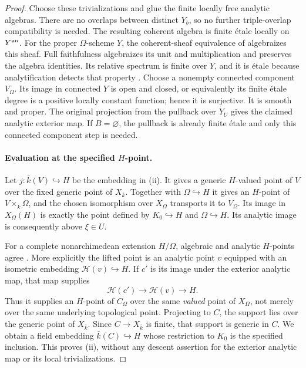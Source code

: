 \begin{proof}
Choose these trivializations and glue the finite locally free
analytic algebras. There are no overlaps between distinct $Y_b$,
so no further triple-overlap compatibility is needed. The resulting
coherent algebra is finite \'etale locally on $Y^{\rm an}$.
For the proper $\Omega$-scheme $Y$, the coherent-sheaf equivalence
of \citet[Appendix A, Theorem A.1(ii)]{D_Poineau2010} algebraizes
this sheaf. Full faithfulness algebraizes its unit and
multiplication and preserves the algebra identities. Its relative
spectrum is finite over $Y$, and it is \'etale because
analytification detects that property
\citep[Fact 5.1.5]{D_Temkin2010}. Choose a nonempty connected
component $V_\Omega$. Its image in connected $Y$ is open and
closed, or equivalently its finite \'etale degree is a positive
locally constant function; hence it is surjective. It is smooth
and proper. The original projection from the pullback over $Y_U$
gives the claimed analytic exterior map. If $B=\varnothing$,
the pullback is already finite \'etale and only this connected
component step is needed.

\paragraph{Evaluation at the specified $H$-point.}
\label{clm:D15-evaluation}
Let $j:\bar k(V)\hookrightarrow H$ be the embedding in (ii).
It gives a generic $H$-valued point of $V$ over the fixed generic
point of $X_{\bar k}$. Together with $\Omega\hookrightarrow H$
it gives an $H$-point of $V\times_{\bar k}\Omega$, and the chosen
isomorphism over $X_\Omega$ transports it to $V_\Omega$.
Its image in $X_\Omega(H)$ is exactly the point defined by
$K_0\hookrightarrow H$ and $\Omega\hookrightarrow H$.
Its analytic image is consequently above $\xi\in U$.

For a complete nonarchimedean extension $H/\Omega$, algebraic and
analytic $H$-points agree
\citep[Fact 5.1.3]{D_Temkin2010}. More explicitly the lifted point
is an analytic point $v$ equipped with an isometric embedding
$\mathcal H(v)\hookrightarrow H$. If $c'$ is its image under the
exterior analytic map, that map supplies
\[
             \mathcal H(c')\longrightarrow\mathcal H(v)
                                      \longrightarrow H.
\]
Thus it supplies an $H$-point of $C_\Omega$ over the same
\emph{valued} point of $X_\Omega$, not merely over the same
underlying topological point. Projecting to $C$, the support lies
over the generic point of $X_{\bar k}$. Since $C\to X_{\bar k}$
is finite, that support is generic in $C$. We obtain a field
embedding $\bar k(C)\hookrightarrow H$ whose restriction to
$K_0$ is the specified inclusion. This proves (ii), without any
descent assertion for the exterior analytic map or its local
trivializations.


\end{proof}
